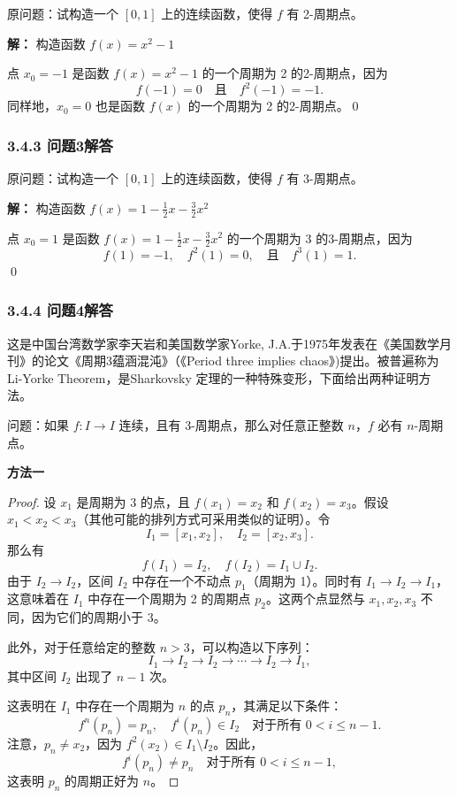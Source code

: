 \documentclass[12pt]{ctexart}
\begin{document}
原问题：试构造一个 $[0, 1]$ 上的连续函数，使得 $f$ 有 2-周期点。

\textbf{解：} 
构造函数 $f(x) = x^2 - 1$  

点 $x_0 = -1$ 是函数 $f(x) = x^2 - 1$ 的一个周期为 2 的2-周期点，因为
\[
f(-1) = 0 \quad \text{且} \quad f^2(-1) = -1.
\]
同样地，$x_0 = 0$ 也是函数 $f(x)$ 的一个周期为 2 的2-周期点。\qed 

\subsubsection*{3.4.3 问题3解答}

原问题：试构造一个 $[0, 1]$ 上的连续函数，使得 $f$ 有 3-周期点。

\textbf{解：} 
构造函数 $f(x) = 1 - \frac{1}{2}x - \frac{3}{2}x^2$

点 $x_0 = 1$ 是函数 $f(x) = 1 - \frac{1}{2}x - \frac{3}{2}x^2$ 的一个周期为 3 的3-周期点，因为
\[
f(1) = -1, \quad f^2(1) = 0, \quad \text{且} \quad f^3(1) = 1.
\]\qed 

\subsubsection*{3.4.4  问题4解答}

这是中国台湾数学家李天岩和美国数学家Yorke, J.A.于1975年发表在《美国数学月刊》的论文《周期3蕴涵混沌》（《Period three implies chaos》)提出。被普遍称为Li-Yorke Theorem，是Sharkovsky 定理的一种特殊变形，下面给出两种证明方法。

问题：如果 $f: I \to I$ 连续，且有 3-周期点，那么对任意正整数 $n$，$f$ 必有 $n$-周期点。

\textbf{方法一}
\begin{proof}
设 $x_1$ 是周期为 3 的点，且 $f(x_1) = x_2$ 和 $f(x_2) = x_3$。假设 $x_1 < x_2 < x_3$（其他可能的排列方式可采用类似的证明）。令
\[
I_1 = [x_1, x_2], \quad I_2 = [x_2, x_3].
\]
那么有
\[
f(I_1) = I_2, \quad f(I_2) = I_1 \cup I_2.
\]
由于 $I_2 \to I_2$，区间 $I_2$ 中存在一个不动点 $p_1$（周期为 1）。同时有 $I_1 \to I_2 \to I_1$，这意味着在 $I_1$ 中存在一个周期为 2 的周期点 $p_2$。这两个点显然与 $x_1, x_2, x_3$ 不同，因为它们的周期小于 3。

此外，对于任意给定的整数 $n > 3$，可以构造以下序列：
\[
I_1 \to I_2 \to I_2 \to \cdots \to I_2 \to I_1,
\]
其中区间 $I_2$ 出现了 $n-1$ 次。

这表明在 $I_1$ 中存在一个周期为 $n$ 的点 $p_n$，其满足以下条件：
\[
f^n(p_n) = p_n, \quad f^i(p_n) \in I_2 \quad \text{对于所有 } 0 < i \leq n-1.
\]
注意，$p_n \neq x_2$，因为 $f^2(x_2) \in I_1 \setminus I_2$。因此，
\[
f^i(p_n) \neq p_n \quad \text{对于所有 } 0 < i \leq n-1,
\]
这表明 $p_n$ 的周期正好为 $n$。

\end{proof}
\end{document}
